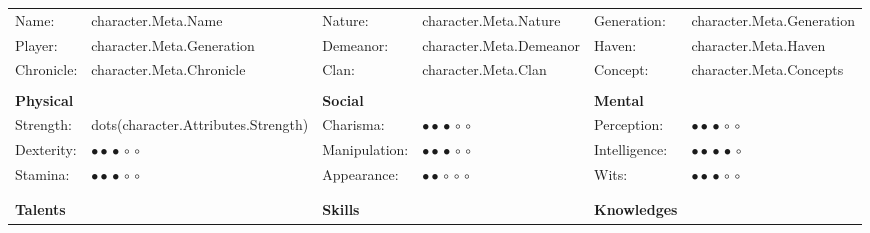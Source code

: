 \documentclass[a4paper,13pt]{scrartcl}
\begin{document}
\pagestyle{empty}
\begin{table}

	\begin{tabular}{ >{\RaggedLeft}p{25mm} >{\RaggedRight}p{25mm} >{\RaggedLeft}p{25mm}  >{\RaggedRight}p{25mm} >{\RaggedLeft}p{25mm} >{\RaggedRight}p{25mm}}


		Name: 		&	{{ character.Meta.Name }}	     &
		Nature: 	&	{{ character.Meta.Nature }}	     &
		Generation: &	{{ character.Meta.Generation }}	\\
		Player: 	&	{{ character.Meta.Generation }}	&
		Demeanor: 	&	{{ character.Meta.Demeanor }}	&
		Haven: 		&	{{ character.Meta.Haven }}		\\
		Chronicle: 	&	{{ character.Meta.Chronicle }}	 &
		Clan: 		&	{{ character.Meta.Clan }}	     &
		Concept:	&	{{ character.Meta.Concepts }}			\\




	 & &&& &\\

		\textbf{Physical} 	&												&
		\textbf{Social}		&												&
		\textbf{Mental}		&												\\


		Strength: 			&	{{dots(character.Attributes.Strength)}}	&
		Charisma: 			&	$\bullet\!\bullet\!\bullet\!\circ\!\circ$ 	&
		Perception:	 		&	$\bullet\!\bullet\!\bullet\!\circ\!\circ$	\\
		Dexterity: 			&	$\bullet\!\bullet\!\bullet\!\circ\!\circ$ 	&
		Manipulation: 		&	$\bullet\!\bullet\!\bullet\!\circ\!\circ$ 	&
		Intelligence: 		&	$\bullet\!\bullet\!\bullet\!\bullet\!\circ$	\\
		Stamina: 			&	$\bullet\!\bullet\!\bullet\!\circ\!\circ$ 	&
		Appearance: 		&	$\bullet\!\bullet\!\circ\!\circ\!\circ$ 	&
		Wits: 				&	$\bullet\!\bullet\!\bullet\!\circ\!\circ$	\\


	&& & & &\\
	 & &&& &\\
		\textbf{Talents}	& 												&
		\textbf{Skills} 	&												&
		\textbf{Knowledges}	&												\\


\end{tabular}
\end{table}
\end{document}
